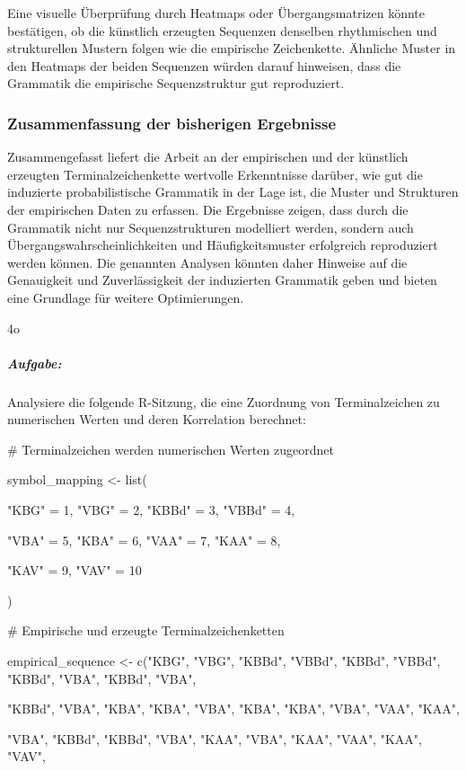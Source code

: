 \documentclass[
]{article}
\begin{document}
Eine visuelle Überprüfung durch Heatmaps oder Übergangsmatrizen könnte
bestätigen, ob die künstlich erzeugten Sequenzen denselben rhythmischen
und strukturellen Mustern folgen wie die empirische Zeichenkette.
Ähnliche Muster in den Heatmaps der beiden Sequenzen würden darauf
hinweisen, dass die Grammatik die empirische Sequenzstruktur gut
reproduziert.

\subsubsection{\texorpdfstring{\textbf{Zusammenfassung der bisherigen
Ergebnisse}}{Zusammenfassung der bisherigen Ergebnisse}}\label{zusammenfassung-der-bisherigen-ergebnisse}

Zusammengefasst liefert die Arbeit an der empirischen und der künstlich
erzeugten Terminalzeichenkette wertvolle Erkenntnisse darüber, wie gut
die induzierte probabilistische Grammatik in der Lage ist, die Muster
und Strukturen der empirischen Daten zu erfassen. Die Ergebnisse zeigen,
dass durch die Grammatik nicht nur Sequenzstrukturen modelliert werden,
sondern auch Übergangswahrscheinlichkeiten und Häufigkeitsmuster
erfolgreich reproduziert werden können. Die genannten Analysen könnten
daher Hinweise auf die Genauigkeit und Zuverlässigkeit der induzierten
Grammatik geben und bieten eine Grundlage für weitere Optimierungen.

4o

\subparagraph{\texorpdfstring{
\textbf{Aufgabe:}}{ Aufgabe:}}\label{aufgabe-2}

Analysiere die folgende R-Sitzung, die eine Zuordnung von
Terminalzeichen zu numerischen Werten und deren Korrelation berechnet:

\# Terminalzeichen werden numerischen Werten zugeordnet

symbol\_mapping \textless- list(

"KBG" = 1, "VBG" = 2, "KBBd" = 3, "VBBd" = 4,

"VBA" = 5, "KBA" = 6, "VAA" = 7, "KAA" = 8,

"KAV" = 9, "VAV" = 10

)

\# Empirische und erzeugte Terminalzeichenketten

empirical\_sequence \textless- c("KBG", "VBG", "KBBd", "VBBd", "KBBd",
"VBBd", "KBBd", "VBA", "KBBd", "VBA",

"KBBd", "VBA", "KBA", "KBA", "VBA", "KBA", "KBA", "VBA", "VAA", "KAA",

"VBA", "KBBd", "KBBd", "VBA", "KAA", "VBA", "KAA", "VAA", "KAA", "VAV",
\end{document}
